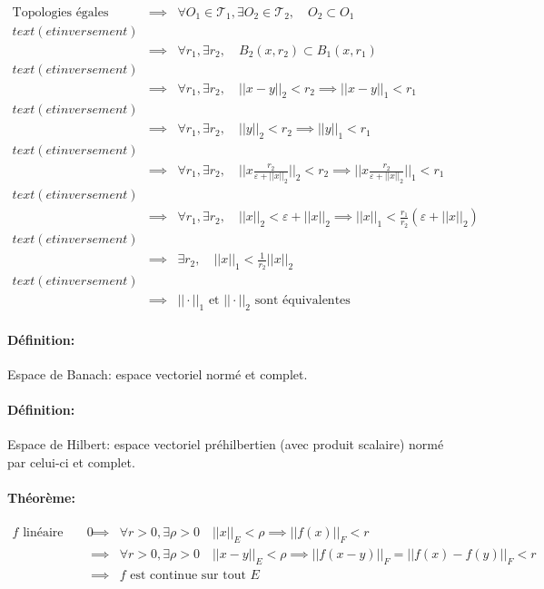 \documentclass[a4paper, 11pt, french]{book}
\theoremstyle{plain} %
\theoremstyle{definition} %
\theoremstyle{remark} %
\newcommand{\1}{\mathds{1}}
\newcommand{\scr}[1]{\mathscr{#1}}
\begin{document}
{\fbox{$\Longleftarrow$}
$
	\begin{array}{rcl}
		\text{Topologies égales}
		  & \implies & \forall O_1\in\scr{T}_1, \exists O_2\in\scr{T}_2, \quad O_2\subset O_1                                                \\text{(et inversement)}\\
		  & \implies & \forall r_1, \exists r_2, \quad B_2(x, r_2)\subset B_1(x, r_1)                                                                \\text{(et inversement)}\\
		  & \implies & \forall r_1, \exists r_2, \quad ||x-y||_2<r_2\implies ||x-y||_1<r_1                                                           \\text{(et inversement)}\\
		  & \implies & \forall r_1, \exists r_2, \quad ||y||_2<r_2\implies ||y||_1<r_1                                                               \\text{(et inversement)}\\
		  & \implies & \forall r_1, \exists r_2, \quad ||x\frac{r_2}{\varepsilon+||x||_2}||_2<r_2\implies ||x\frac{r_2}{\varepsilon+||x||_2}||_1<r_1 \\text{(et inversement)}\\
		  & \implies & \forall r_1, \exists r_2, \quad ||x||_2<\varepsilon+||x||_2\implies ||x||_1<\frac{r_1}{r_2}(\varepsilon+||x||_2)              \\text{(et inversement)}\\
		  & \implies & \exists r_2, \quad ||x||_1 <\frac{1}{r_2}||x||_2                                                                              \\text{(et inversement)}\\
		  & \implies & \text{$|| \cdot||_1$ et $|| \cdot||_2$ sont équivalentes}
	\end{array}
$

\paragraph{Définition:} Espace de Banach: espace vectoriel normé et complet.
\paragraph{Définition:} Espace de Hilbert: espace vectoriel préhilbertien (avec produit scalaire) normé par celui-ci et complet.

\paragraph{Théorème:}
$
	\begin{array}{rcl}
		\text{$f$ linéaire entre evn continue en $0$}
		  & \implies & \forall r > 0, \exists\rho > 0\quad ||x||_E <\rho\implies ||f(x)||_F < r                     \\
		  & \implies & \forall r > 0, \exists\rho > 0\quad ||x-y||_E <\rho\implies ||f(x-y)||_F=||f(x)-f(y)||_F < r \\
		  & \implies & \text{$f$ est continue sur tout $E$}
	\end{array}
$

}
\end{document}
